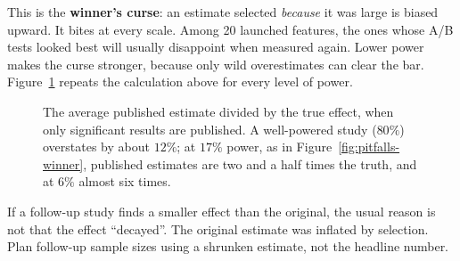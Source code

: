 This is the \textbf{winner's curse}: an estimate selected \emph{because} it was
large is biased upward. It bites at every scale. Among 20 launched features,
the ones whose A/B tests looked best will usually disappoint when measured again.
Lower power makes the curse stronger, because only wild overestimates can clear
the bar. Figure~\ref{fig:pitfalls-exaggeration} repeats the calculation above for
every level of power.

\begin{figure}[H]
\centering
{}
\caption{The average published estimate divided by the true effect, when only
significant results are published. A well-powered study ($80\%$) overstates by about
$12\%$; at $17\%$ power, as in Figure~\ref{fig:pitfalls-winner}, published estimates are
two and a half times the truth, and at $6\%$ almost six times.}
\label{fig:pitfalls-exaggeration}
\end{figure}

\begin{trapbox}
If a follow-up study finds a smaller effect than the original, the usual reason is
not that the effect ``decayed''. The original estimate was inflated by selection.
Plan follow-up sample sizes using a shrunken estimate, not the headline number.
\end{trapbox}

